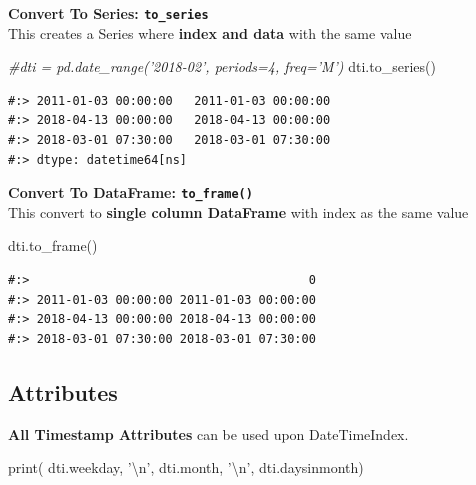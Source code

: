\documentclass[
]{book}
\newenvironment{Shaded}{\begin{snugshade}}{\end{snugshade}}
\newcommand{\BuiltInTok}[1]{#1}
\newcommand{\CharTok}[1]{\textcolor[rgb]{0.5,0.5,0.5}{#1}}
\newcommand{\CommentTok}[1]{\textcolor[rgb]{0.37,0.37,0.37}{\textit{#1}}}
\newcommand{\NormalTok}[1]{#1}
\newcommand{\StringTok}[1]{\textcolor[rgb]{0.5,0.5,0.5}{#1}}
\begin{document}
\textbf{Convert To Series: \texttt{to\_series}}\\
This creates a Series where \textbf{index and data} with the same value

\begin{Shaded}
\begin{Highlighting}[]
\CommentTok{#dti = pd.date_range('2018-02', periods=4, freq='M')}
\NormalTok{dti.to_series()}
\end{Highlighting}
\end{Shaded}

\begin{verbatim}
#:> 2011-01-03 00:00:00   2011-01-03 00:00:00
#:> 2018-04-13 00:00:00   2018-04-13 00:00:00
#:> 2018-03-01 07:30:00   2018-03-01 07:30:00
#:> dtype: datetime64[ns]
\end{verbatim}

\textbf{Convert To DataFrame: \texttt{to\_frame()}}\\
This convert to \textbf{single column DataFrame} with index as the same value

\begin{Shaded}
\begin{Highlighting}[]
\NormalTok{dti.to_frame()}
\end{Highlighting}
\end{Shaded}

\begin{verbatim}
#:>                                       0
#:> 2011-01-03 00:00:00 2011-01-03 00:00:00
#:> 2018-04-13 00:00:00 2018-04-13 00:00:00
#:> 2018-03-01 07:30:00 2018-03-01 07:30:00
\end{verbatim}

\hypertarget{attributes-5}{%
\subsection{Attributes}\label{attributes-5}}

\textbf{All Timestamp Attributes} can be used upon DateTimeIndex.

\begin{Shaded}
\begin{Highlighting}[]
\BuiltInTok{print}\NormalTok{( dti.weekday, }\StringTok{'}\CharTok{\textbackslash{}n}\StringTok{'}\NormalTok{,}
\NormalTok{       dti.month, }\StringTok{'}\CharTok{\textbackslash{}n}\StringTok{'}\NormalTok{,}
\NormalTok{       dti.daysinmonth)}
\end{Highlighting}
\end{Shaded}
\end{document}
